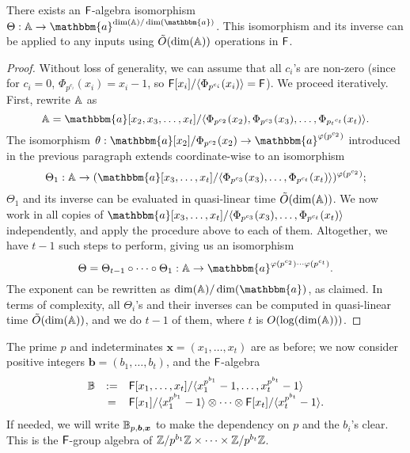 \begin{lemma}\label{lemma:A}
  There exists an ${\mathsf{F}}$-algebra isomorphism $\Theta: \A \to
  \mathbbm{a}^{\dim(\A)/\dim(\mathbbm{a})}$. This isomorphism and its
  inverse can be applied to any inputs using $\tilde{O}(\dim(\mathbb{A}))$
  operations in ${\mathsf{F}}$.
\end{lemma}
\begin{proof}
Without loss of generality, we can assume that all $c_i$'s are non-zero
(since for $c_i=0$, $\Phi_{p^{c_i}}(x_i)=x_i-1$,
so ${\mathsf{F}}[x_i]/\langle \Phi_{p^{c_i}}(x_i) \rangle = {\mathsf{F}}$).
We proceed iteratively. First, rewrite $\mathbb{A}$ as
$$\A=\mathbbm{a}[x_2,x_3,\dots,x_t]/\langle \Phi_{p^{c_2}}(x_2), \Phi_{p^{c_3}}(x_3), \dots,
\Phi_{{p_t}^{c_t}}(x_t)\rangle.$$ 
The isomorphism 
$\theta: \mathbbm{a}[x_2]/\Phi_{p^{c_2}}(x_2) \to \mathbbm{a}^{\varphi(p^{c_2})}$
introduced in the previous paragraph extends coordinate-wise
to an isomorphism 
$$\Theta_1: \A \to (\mathbbm{a}[x_3,\dots,x_t]/\langle
\Phi_{p^{c_3}}(x_3), \dots,
\Phi_{p^{c_t}}(x_t)\rangle)^{\varphi(p^{c_2})};$$ $\Theta_1$ and its
inverse can be evaluated in quasi-linear time $\tilde{O}(\dim(\mathbb{A}))$.
We now work in all copies of $\mathbbm{a}[x_3,\dots,x_t]/\langle
\Phi_{p^{c_3}}(x_3), \dots, \Phi_{p^{c_t}}(x_t)\rangle$ independently,
and apply the procedure above to each of them. Altogether, we have
$t-1$ such steps to perform, giving us an isomorphism
$$\Theta = \Theta_{t-1} \circ \cdots \circ \Theta_1:
\A \to
\mathbbm{a}^{\varphi(p^{c_2}) \cdots \varphi(p^{c_t})}.$$
The exponent can be rewritten as $ \dim(\A)/\dim(\mathbbm{a})$, as claimed.
In terms of complexity, all $\Theta_i$'s and their inverses can be computed
in quasi-linear time $\tilde{O}(\dim(\mathbb{A}))$, and we do $t-1$ of them,
where $t$ is $O(\log(\dim(\mathbb{A})))$. 
\end{proof}

  The prime $p$
and indeterminates $\boldsymbol{x}=(x_1,\dots,x_t)$ are as before; we now consider
positive integers $\boldsymbol{b}=(b_1,\dots,b_t)$, and the ${\mathsf{F}}$-algebra
\[
\begin{array}{ccl}
\B&:=&\F[x_1,\dots,x_t]/\langle x_1^{p^{b_1}}-1,\dots,x_t^{p^{b_t}}-1\rangle\\$$
&=& \F[x_1]/\langle x_1^{p^{b_1}}-1 \rangle \otimes \cdots \otimes \F[x_t]/\langle x_t^{p^{b_t}}-1 \rangle.
\end{array}
\]
If needed, we will write $\mathbb{B}_{p,\boldsymbol{b},\boldsymbol{x}}$ to make the dependency
on $p$ and the $b_i$'s clear. This is the ${\mathsf{F}}$-group algebra
of $\mathbb{Z}/p^{b_1}\mathbb{Z} \times \cdots \times \mathbb{Z}/p^{b_t}\mathbb{Z}$.

